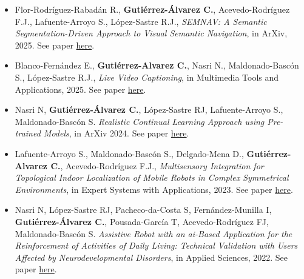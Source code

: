 \begin{itemize}
    \item Flor-Rodríguez-Rabadán R., \textbf{Gutiérrez-Álvarez C.}, Acevedo-Rodríguez F.J., Lafuente-Arroyo S., López-Sastre R.J., \textit{SEMNAV: A Semantic Segmentation-Driven Approach to Visual Semantic Navigation}, in ArXiv, 2025.
    See paper \href{https://arxiv.org/abs/2506.01418}{here}.
    \item Blanco-Fernández E., \textbf{Gutiérrez-Alvarez C.}, Nasri N., Maldonado-Bascón S., López-Sastre R.J., \textit{Live Video Captioning}, in Multimedia Tools and Applications, 2025.
    See paper \href{https://link.springer.com/article/10.1007/s11042-025-20908-w}{here}.
    \item Nasri N, \textbf{Gutiérrez-Álvarez C.}, López-Sastre RJ, Lafuente-Arroyo S., Maldonado-Bascón S. \textit{Realistic Continual Learning Approach using Pre-trained Models}, in ArXiv 2024.
    See paper \href{https://arxiv.org/abs/2404.07729}{here}.
    \item Lafuente-Arroyo S., Maldonado-Bascón S., Delgado-Mena D., \textbf{Gutiérrez-Alvarez C.}, Acevedo-Rodríguez F.J., \textit{Multisensory Integration for Topological Indoor Localization of Mobile Robots in Complex Symmetrical Environments}, in Expert Systems with Applications, 2023.
    See paper \href{https://www.sciencedirect.com/science/article/pii/S0957417423030634}{here}.
    \item Nasri N, López-Sastre RJ, Pacheco-da-Costa S, Fernández-Munilla I, \textbf{Gutiérrez-Álvarez C.}, Pousada-García T, Acevedo-Rodríguez FJ, Maldonado-Bascón S. \textit{Assistive Robot with an \acrshort{ai}-Based Application for the Reinforcement of Activities of Daily Living: Technical Validation with Users Affected by Neurodevelopmental Disorders}, in Applied Sciences, 2022.
    See paper \href{https://www.mdpi.com/2076-3417/12/19/9566}{here}.
\end{itemize}